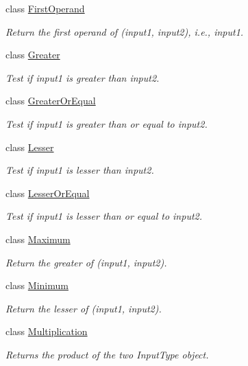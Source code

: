\begin{DoxyCompactItemize}
class \hyperlink{classvct_binary_operations_1_1_first_operand}{First\+Operand}
\begin{DoxyCompactList}\small\item\em Return the first operand of (input1, input2), i.\+e., input1. \end{DoxyCompactList}\item 
class \hyperlink{classvct_binary_operations_1_1_greater}{Greater}
\begin{DoxyCompactList}\small\item\em Test if input1 is greater than input2. \end{DoxyCompactList}\item 
class \hyperlink{classvct_binary_operations_1_1_greater_or_equal}{Greater\+Or\+Equal}
\begin{DoxyCompactList}\small\item\em Test if input1 is greater than or equal to input2. \end{DoxyCompactList}\item 
class \hyperlink{classvct_binary_operations_1_1_lesser}{Lesser}
\begin{DoxyCompactList}\small\item\em Test if input1 is lesser than input2. \end{DoxyCompactList}\item 
class \hyperlink{classvct_binary_operations_1_1_lesser_or_equal}{Lesser\+Or\+Equal}
\begin{DoxyCompactList}\small\item\em Test if input1 is lesser than or equal to input2. \end{DoxyCompactList}\item 
class \hyperlink{classvct_binary_operations_1_1_maximum}{Maximum}
\begin{DoxyCompactList}\small\item\em Return the greater of (input1, input2). \end{DoxyCompactList}\item 
class \hyperlink{classvct_binary_operations_1_1_minimum}{Minimum}
\begin{DoxyCompactList}\small\item\em Return the lesser of (input1, input2). \end{DoxyCompactList}\item 
class \hyperlink{classvct_binary_operations_1_1_multiplication}{Multiplication}
\begin{DoxyCompactList}\small\item\em Returns the product of the two Input\+Type object. \end{DoxyCompactList}\item 

\end{DoxyCompactItemize}
